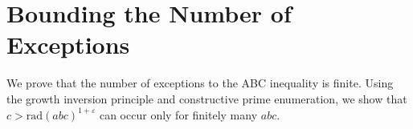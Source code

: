 
\section{Bounding the Number of Exceptions}
We prove that the number of exceptions to the ABC inequality is finite.
Using the growth inversion principle and constructive prime enumeration,
we show that \( c > \mathrm{rad}(abc)^{1+\varepsilon} \) can occur only for finitely many \( abc \).
